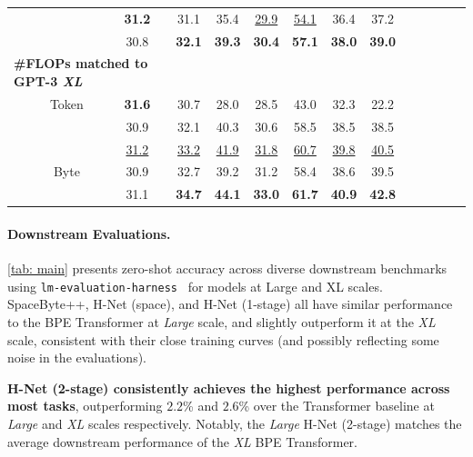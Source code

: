 \documentclass{article}
\newcommand{\citep}{\parencite}
\newcommand{\model}{H-Net}
\newcommand{\twostage}{2-stage}
\newcommand{\onestage}{1-stage}
\newcommand{\best}[1]{\textbf{#1}}
\newcommand{\second}[1]{\underline{#1}}
\theoremstyle{plain}
\theoremstyle{remark}
\begin{document}
\begin{table}[t!]
{\begin{tabular}{lccccccccccccc}
\cellcolor{Orange7!10}{\model{} (\onestage{})} & & \best{31.2} & 31.1 & 35.4 & \second{29.9} & \second{54.1} & 36.4 & 37.2\\
\cellcolor{Red7!10}{\model{} (\twostage{})} & & 30.8 & \best{32.1} & \best{39.3} & \best{30.4} & \best{57.1} & \best{38.0} & \best{39.0}\\
\midrule
\multicolumn{3}{l}{\quad \textbf{\#FLOPs matched to GPT-3 \textit{XL}}}\\
\cellcolor{Gray7!20}{Transformer} & Token & \best{31.6} & 30.7 & 28.0 & 28.5 & 43.0 & 32.3 & 22.2\\
\addlinespace[-0.15em]
\cmidrule{1-9}
\addlinespace[-0.25em]
\cellcolor{Cyan7!10}{SpaceByte++} & & 30.9 & 32.1 & 40.3 & 30.6 & 58.5 & 38.5 & 38.5\\
\cellcolor{Green7!10}{H-Net (space)} & & \second{31.2} & \second{33.2} & \second{41.9} & \second{31.8} & \second{60.7} & \second{39.8} & \second{40.5} \\
\cellcolor{Orange7!10}{\model{} (\onestage{})} & \multirow{-2}{*}{Byte} & 30.9 & 32.7 & 39.2 & 31.2 & 58.4 & 38.6 & 39.5\\
\cellcolor{Red7!10}{\model{} (\twostage{})} & & 31.1 & \best{34.7} & \best{44.1} & \best{33.0} & \best{61.7} & \best{40.9} & \best{42.8}\\
\bottomrule
\end{tabular}
} 
\label{tab: aug_hellaswag}
\end{table}

\paragraph{Downstream Evaluations.}
\cref{tab: main} presents zero-shot accuracy across diverse downstream benchmarks~\citep{LAMBADA, HellaSwag, PIQA, ARC, WinoGrande, OpenBookQA} using \texttt{lm-evaluation-harness}~\citep{LMEvalHarness} for models at Large and XL scales.
SpaceByte++, H-Net (space), and H-Net (1-stage) all have similar performance to the BPE Transformer at \emph{Large} scale,
and slightly outperform it at the \emph{XL} scale,
consistent with their close training curves (and possibly reflecting some noise in the evaluations).

\textbf{\model{} (\twostage{}) consistently achieves the highest performance across most tasks},
outperforming $2.2$\% and $2.6$\% over the Transformer baseline at \emph{Large} and \emph{XL} scales respectively.
Notably, the \emph{Large} H-Net (2-stage) matches the average downstream performance of the \emph{XL} BPE Transformer.
\end{document}
